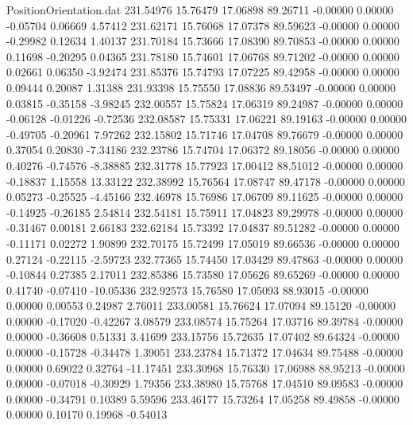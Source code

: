 \begin{filecontents}{PositionOrientation.dat}
 231.54976   15.76479   17.06898    89.26711   -0.00000    0.00000   -0.05704    0.06669    4.57412
 231.62171   15.76068   17.07378    89.59623   -0.00000    0.00000   -0.29982    0.12634    1.40137
 231.70184   15.73666   17.08390    89.70853   -0.00000    0.00000    0.11698   -0.20295    0.04365
 231.78180   15.74601   17.06768    89.71202   -0.00000    0.00000    0.02661    0.06350   -3.92474
 231.85376   15.74793   17.07225    89.42958   -0.00000    0.00000    0.09444    0.20087    1.31388
 231.93398   15.75550   17.08836    89.53497   -0.00000    0.00000    0.03815   -0.35158   -3.98245
 232.00557   15.75824   17.06319    89.24987   -0.00000    0.00000   -0.06128   -0.01226   -0.72536
 232.08587   15.75331   17.06221    89.19163   -0.00000    0.00000   -0.49705   -0.20961    7.97262
 232.15802   15.71746   17.04708    89.76679   -0.00000    0.00000    0.37054    0.20830   -7.34186
 232.23786   15.74704   17.06372    89.18056   -0.00000    0.00000    0.40276   -0.74576   -8.38885
 232.31778   15.77923   17.00412    88.51012   -0.00000    0.00000   -0.18837    1.15558   13.33122
 232.38992   15.76564   17.08747    89.47178   -0.00000    0.00000    0.05273   -0.25525   -4.45166
 232.46978   15.76986   17.06709    89.11625   -0.00000    0.00000   -0.14925   -0.26185    2.54814
 232.54181   15.75911   17.04823    89.29978   -0.00000    0.00000   -0.31467    0.00181    2.66183
 232.62184   15.73392   17.04837    89.51282   -0.00000    0.00000   -0.11171    0.02272    1.90899
 232.70175   15.72499   17.05019    89.66536   -0.00000    0.00000    0.27124   -0.22115   -2.59723
 232.77365   15.74450   17.03429    89.47863   -0.00000    0.00000   -0.10844    0.27385    2.17011
 232.85386   15.73580   17.05626    89.65269   -0.00000    0.00000    0.41740   -0.07410  -10.05336
 232.92573   15.76580   17.05093    88.93015   -0.00000    0.00000    0.00553    0.24987    2.76011
 233.00581   15.76624   17.07094    89.15120   -0.00000    0.00000   -0.17020   -0.42267    3.08579
 233.08574   15.75264   17.03716    89.39784   -0.00000    0.00000   -0.36608    0.51331    3.41699
 233.15756   15.72635   17.07402    89.64324   -0.00000    0.00000   -0.15728   -0.34478    1.39051
 233.23784   15.71372   17.04634    89.75488   -0.00000    0.00000    0.69022    0.32764  -11.17451
 233.30968   15.76330   17.06988    88.95213   -0.00000    0.00000   -0.07018   -0.30929    1.79356
 233.38980   15.75768   17.04510    89.09583   -0.00000    0.00000   -0.34791    0.10389    5.59596
 233.46177   15.73264   17.05258    89.49858   -0.00000    0.00000    0.10170    0.19968   -0.54013

\end{filecontents}
